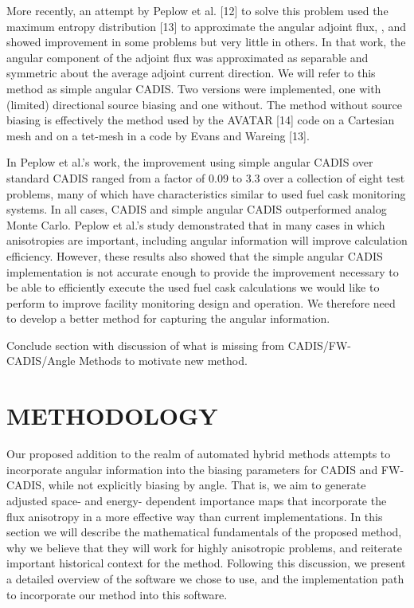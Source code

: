 \documentclass[12pt]{article}
\begin{document}
More recently, an attempt by Peplow et al. [12] to solve this problem used the maximum entropy distribution [13] to approximate the angular adjoint flux, , and showed improvement in some problems but very little in others. In that work, the angular component of the adjoint flux was approximated as separable and symmetric about the average adjoint current direction. We will refer to this method as simple angular CADIS. Two versions were implemented, one with (limited) directional source biasing and one without. The method without source biasing is effectively the method used by the AVATAR [14] code on a Cartesian mesh and on a tet-mesh in a code by Evans and Wareing [13]. 

In Peplow et al.’s work, the improvement using simple angular CADIS over standard CADIS ranged from a factor of 0.09 to 3.3 over a collection of eight test problems, many of which have characteristics similar to used fuel cask monitoring systems. In all cases, CADIS and simple angular CADIS outperformed analog Monte Carlo. Peplow et al.’s study demonstrated that in many cases in which anisotropies are important, including angular information will improve calculation efficiency. However, these results also showed that the simple angular CADIS implementation is not accurate enough to provide the improvement necessary to be able to efficiently execute the used fuel cask calculations we would like to perform to improve facility monitoring design and operation. We therefore need to develop a better method for capturing the angular information.  
	


Conclude section with discussion of what is missing from CADIS/FW-CADIS/Angle Methods to motivate new method. \\

%
\section{METHODOLOGY}
\label{sect::methodology}

Our proposed addition to the realm of automated hybrid methods attempts to incorporate angular information into the biasing parameters for CADIS and FW-CADIS, while not explicitly biasing by angle. That is, we aim to generate adjusted space- and energy- dependent importance maps that incorporate the flux anisotropy in a more effective way than current implementations. In this section we will describe the mathematical fundamentals of the proposed method, why we believe that they will work for highly anisotropic problems, and reiterate important historical context for the method. Following this discussion, we present a detailed overview of the software we chose to use, and the implementation path to incorporate our method into this software.  \\
\end{document}
